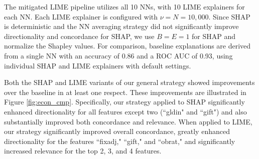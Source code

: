 \documentclass[mnsc,blindrev]{informs3}
\begin{document}
The mitigated LIME pipeline utilizes all 10 NNs, with 10 LIME explainers for each NN. Each LIME explainer is configured with $\nu = N = 10,000$. Since SHAP is deterministic and the NN averaging strategy did not significantly improve directionality and concordance for SHAP, we use $B = E = 1$ for SHAP and normalize the Shapley values. For comparison, baseline explanations are derived from a single NN with an accuracy of 0.86 and a ROC AUC of 0.93, using individual SHAP and LIME explainers with default settings.




    Both the SHAP and LIME variants of our general strategy showed improvements over the baseline in at least one respect. These improvements are illustrated in Figure \ref{fig:econ_cmp}. Specifically, our strategy applied to SHAP significantly enhanced directionality for all features except two (``gldin" and ``gift") and also substantially improved both concordance and relevance. When applied to LIME, our strategy significantly improved overall concordance, greatly enhanced directionality for the features ``fixadj," ``gift," and ``obrat," and significantly increased relevance for the top 2, 3, and 4 features.%

     
\end{document}
